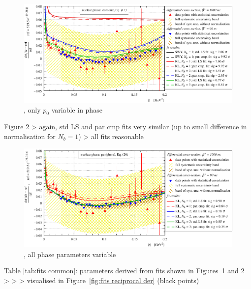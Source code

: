 \begin{figure}
\begin{center}
\includegraphics{fig/fits_common_con.pdf}
\caption{, only $p_0$ variable in phase}
\label{fig:fits common con}
\end{center}
\end{figure}

\> Figure \ref{fig:fits common per}
\>> again, std LS and par cmp fits very similar (up to small difference in normalisation for $N_b = 1$)
\>> all fits reasonable

\begin{figure}
\begin{center}
\includegraphics{fig/fits_common_per.pdf}
\caption{, all phase parameters variable}
\label{fig:fits common per}
\end{center}
\end{figure}

\> Table \ref{tab:fits common}: parameters derived from fits shown in Figures~\ref{fig:fits common con} and \ref{fig:fits common per}
\>> 
\>> 
\>> visualised in Figure~\ref{fig:fits reciprocal der} (black points)


